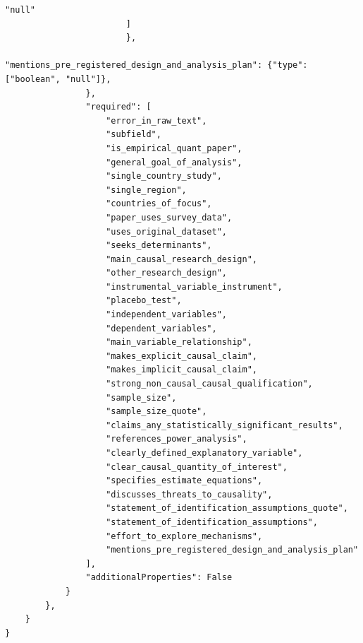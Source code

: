 \documentclass[12pt]{article}
\begin{document}
{\begin{Verbatim}[breaklines=true]
                            "null"
                        ]
                        },
                    "mentions_pre_registered_design_and_analysis_plan": {"type": ["boolean", "null"]},
                },
                "required": [
                    "error_in_raw_text",
                    "subfield",
                    "is_empirical_quant_paper",
                    "general_goal_of_analysis",
                    "single_country_study",
                    "single_region",
                    "countries_of_focus",
                    "paper_uses_survey_data",
                    "uses_original_dataset",
                    "seeks_determinants",
                    "main_causal_research_design",
                    "other_research_design",
                    "instrumental_variable_instrument",
                    "placebo_test",
                    "independent_variables",
                    "dependent_variables",
                    "main_variable_relationship",
                    "makes_explicit_causal_claim",
                    "makes_implicit_causal_claim",
                    "strong_non_causal_causal_qualification",
                    "sample_size",
                    "sample_size_quote",
                    "claims_any_statistically_significant_results",
                    "references_power_analysis",
                    "clearly_defined_explanatory_variable",
                    "clear_causal_quantity_of_interest",
                    "specifies_estimate_equations",
                    "discusses_threats_to_causality",
                    "statement_of_identification_assumptions_quote",
                    "statement_of_identification_assumptions",
                    "effort_to_explore_mechanisms",
                    "mentions_pre_registered_design_and_analysis_plan"
                ],
                "additionalProperties": False
            }
        },
    }
}

\end{Verbatim}
}

\vspace{1em}
\end{document}
